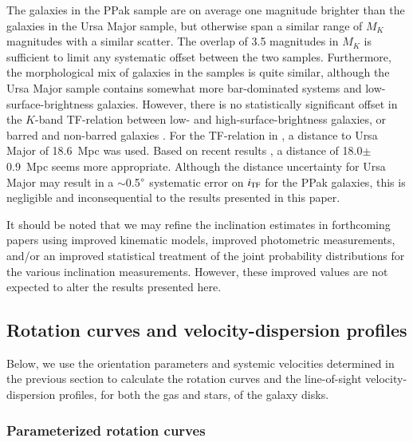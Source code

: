 \documentclass[traditabstract]{aa} %
\begin{document}
The galaxies in the PPak sample are on average one magnitude brighter than the galaxies in
the Ursa Major sample, but otherwise span a similar range of $M_K$ magnitudes with a
similar scatter. The overlap of 3.5 magnitudes in $M_K$ is sufficient to limit any
systematic offset between the two samples. Furthermore, the morphological mix of galaxies
in the samples is quite similar, although the Ursa Major sample contains somewhat more
bar-dominated systems and low-surface-brightness galaxies. However, there is no
statistically significant offset in the $K$-band TF-relation between low- and
high-surface-brightness galaxies, or barred and non-barred galaxies 
\citep[e.g.][]{courteau2003}.
%
For the TF-relation in \cite{verheyen2001b}, a distance to Ursa Major of 18.6~Mpc
\citep{tully2000} was used. Based on recent results \citep{sorce2013}, a
distance of 18.0$\pm$0.9~Mpc seems more appropriate.  
Although the distance uncertainty for Ursa Major may result in a $\sim$0.5$\mbox{$^\circ$}$
systematic error on $i_{\rm TF}$ for the PPak galaxies, this is negligible and inconsequential
to the results presented in this paper.

It should be noted that we may refine the inclination estimates in forthcoming papers
using improved kinematic models, improved photometric measurements, and/or an improved
statistical treatment of the joint probability distributions for the various inclination
measurements. However, these improved values are not expected to alter the results presented here.




\subsection{Rotation curves and velocity-dispersion profiles}
\label{sec:ArotAsca}

Below, we use the orientation parameters and systemic velocities determined in
the previous section to calculate the rotation curves and the line-of-sight
velocity-dispersion profiles, for both the gas and stars, of the galaxy disks.


\subsubsection{Parameterized rotation curves}
\label{sec:tanhRC}
\end{document}
